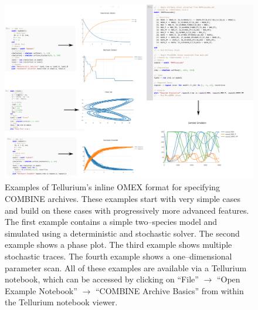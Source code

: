 \documentclass[10pt,letterpaper]{article}
\begin{document}
\clearpage

\begin{figure}
  \includegraphics[width=1.0\textwidth]{fig-inline-omex.pdf}
  \caption{Examples of Tellurium's inline OMEX format for specifying COMBINE archives. These examples start with very simple cases and build on these cases with progressively more advanced features. The first example contains a simple two--species model and simulated using a deterministic and stochastic solver. The second example shows a phase plot. The third example shows multiple stochastic traces. The fourth example shows a one--dimensional parameter scan. All of these examples are available via a Tellurium notebook, which can be accessed by clicking on ``File'' $\rightarrow$ ``Open Example Notebook'' $\rightarrow$ ``COMBINE Archive Basics'' from within the Tellurium notebook viewer. }
  \label{fig:inlineomex}
\end{figure}

\clearpage
\end{document}

